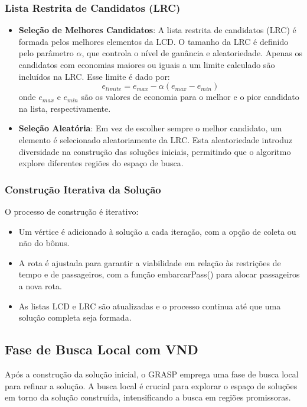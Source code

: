 \documentclass[12pt, a4paper]{report}
\begin{document}
\subsubsection*{Lista Restrita de Candidatos (LRC)}
\begin{itemize}
    \item \textbf{Seleção de Melhores Candidatos}: A lista restrita de candidatos (LRC) é formada pelos melhores elementos da LCD.  O tamanho da LRC é definido pelo parâmetro $\alpha$, que controla o nível de ganância e aleatoriedade. Apenas os candidatos com economias maiores ou iguais a um limite calculado são incluídos na LRC. Esse limite é dado por:
    $$ e_{limite} = e_{max} - \alpha (e_{max} - e_{min}) $$
     onde $e_{max}$ e $e_{min}$ são os valores de economia para o melhor e o pior candidato na lista, respectivamente.

    \item \textbf{Seleção Aleatória}: Em vez de escolher sempre o melhor candidato, um elemento é selecionado aleatoriamente da LRC. Esta aleatoriedade introduz diversidade na construção das soluções iniciais, permitindo que o algoritmo explore diferentes regiões do espaço de busca.
\end{itemize}

\subsubsection*{Construção Iterativa da Solução}
O processo de construção é iterativo:
\begin{itemize}
    \item Um vértice é adicionado à solução a cada iteração, com a opção de coleta ou não do bônus.
     \item A rota é ajustada para garantir a viabilidade em relação às restrições de tempo e de passageiros, com a função embarcarPass() para alocar passageiros a nova rota.
    \item As listas LCD e LRC são atualizadas e o processo continua até que uma solução completa seja formada.
\end{itemize}

\subsection*{Fase de Busca Local com VND}

Após a construção da solução inicial, o GRASP emprega uma fase de busca local para refinar a solução. A busca local é crucial para explorar o espaço de soluções em torno da solução construída, intensificando a busca em regiões promissoras.
\end{document}
